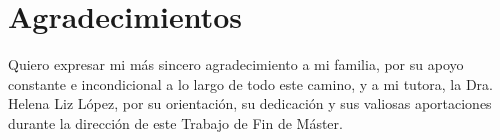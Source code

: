 %
\section*{Agradecimientos}
\label{sec::agradecimientos}


Quiero expresar mi más sincero agradecimiento a mi familia, por su apoyo constante e
incondicional a lo largo de todo este camino, y a mi tutora, la Dra. Helena Liz López,
por su orientación, su dedicación y sus valiosas aportaciones durante la dirección de
este Trabajo de Fin de Máster.





